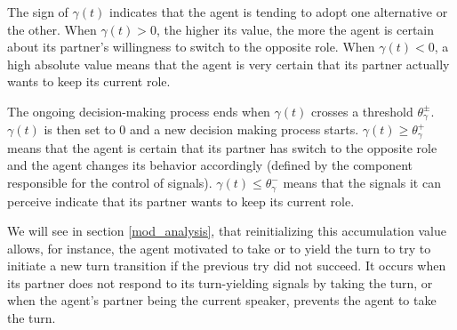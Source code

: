 The sign of $\gamma(t)$ indicates that the agent is tending to adopt one alternative or the other. 
When $\gamma(t)>0$, the higher its value, the more the agent is certain about its partner's willingness to switch to the opposite role.
When $\gamma(t)<0$, a high absolute value means that the agent is very certain that its partner actually wants to keep its current role. 

The ongoing decision-making process ends when $\gamma(t)$ crosses a threshold $\theta_{\gamma}^{\pm}$. $\gamma(t)$ is then set to 0 and a new decision making process starts.
$\gamma(t) \geq \theta_{\gamma}^{+}$ means that the agent is certain that its partner has switch to the opposite role and the agent changes its behavior accordingly (defined by the component responsible for the control of signals). $\gamma(t) \leq \theta_{\gamma}^{-}$ means that the signals it can perceive indicate that its partner wants to keep its current role. 


We will see in section \ref{mod_analysis}, that reinitializing this accumulation value allows, for instance, the agent motivated to take or to yield the turn to try to initiate a new turn transition if the previous try did not succeed. 
It occurs when its partner does not respond to its turn-yielding signals by taking the turn, or when the agent's partner being the current speaker, prevents the agent to take the turn.


